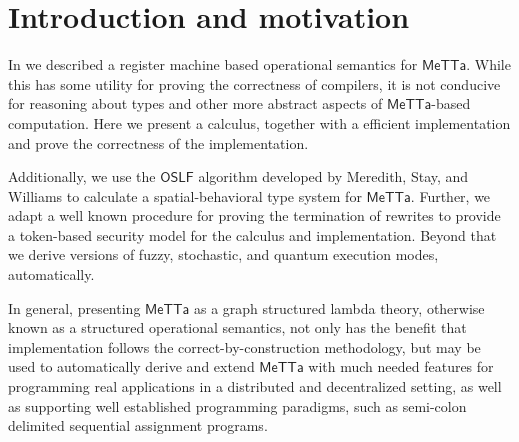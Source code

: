 \section{Introduction and motivation}

In \cite{arxiv:meta-metta-opsem:meredith} we described a register
machine based operational semantics for $\mathsf{MeTTa}$. While this
has some utility for proving the correctness of compilers, it is not
conducive for reasoning about types and other more abstract aspects of
$\mathsf{MeTTa}$-based computation. Here we present a calculus,
together with a efficient implementation and prove the correctness of
the implementation.

Additionally, we use the $\mathsf{OSLF}$ algorithm developed by
Meredith, Stay, and Williams to calculate a spatial-behavioral type
system for $\mathsf{MeTTa}$. Further, we adapt a well known procedure
for proving the termination of rewrites to provide a token-based
security model for the calculus and implementation. Beyond that we
derive versions of fuzzy, stochastic, and quantum execution modes,
automatically.

In general, presenting $\mathsf{MeTTa}$ as a graph structured lambda
theory, otherwise known as a structured operational semantics, not
only has the benefit that implementation follows the
correct-by-construction methodology, but may be used to automatically
derive and extend $\mathsf{MeTTa}$ with much needed features for
programming real applications in a distributed and decentralized
setting, as well as supporting well established programming paradigms,
such as semi-colon delimited sequential assignment programs.
